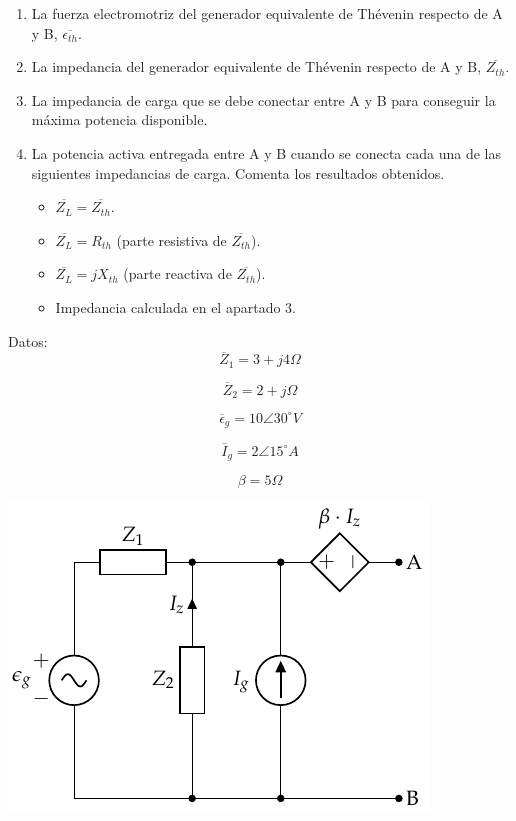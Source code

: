 \documentclass[12pt]{article}
\begin{document}
\begin{enumerate}
\item La fuerza electromotriz del generador equivalente de Thévenin respecto de A y B,  \(\overline{\epsilon_{th}}\).
\item La impedancia del generador equivalente de Thévenin respecto de A y B, \(\overline{Z_{th}}\).
\item La impedancia de carga que se debe conectar entre A y B para conseguir la máxima potencia disponible.
\item La potencia activa entregada entre A y B cuando se conecta cada una de las siguientes impedancias de carga. Comenta los resultados obtenidos.
\begin{itemize}
\item \(\overline{Z_L} = \overline{Z_{th}}\).
\item \(\overline{Z_L} = R_{th}\) (parte resistiva de \(\overline{Z_{th}}\)).
\item \(\overline{Z_L} = j X_{th}\) (parte reactiva de \(\overline{Z_{th}}\)).
\item Impedancia calculada en el apartado 3.
\end{itemize}
\end{enumerate}

\begin{minipage}{0.3\linewidth}
Datos:
\[
\overline{Z}_1 = 3 + j4\Omega
\]

\[
\overline{Z}_2 = 2 + j\Omega
\]

\[
\overline{\epsilon}_g = 10\angle 30^{\circ} V 
\]

\[
\overline{I}_g = 2\angle 15^{\circ} A
\]

\[
\beta = 5 \Omega
\]
\end{minipage}
\begin{minipage}{0.7\linewidth}
\includegraphics[width=.9\linewidth]{figs/theveninExt.pdf}
\end{minipage}
\end{document}
